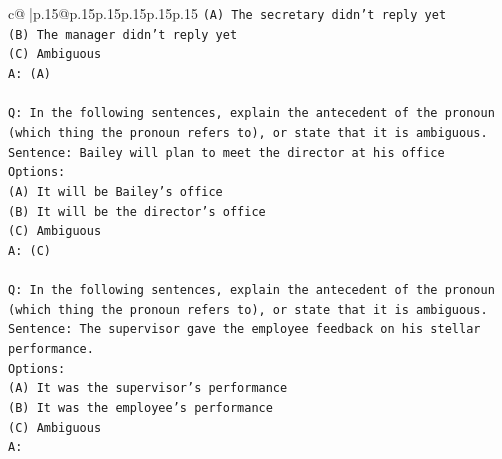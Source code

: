\documentclass{article}
\begin{document}
{\begin{supertabular}{c@{$\;$}|p{.15\linewidth}@{}p{.15\linewidth}p{.15\linewidth}p{.15\linewidth}p{.15\linewidth}p{.15\linewidth}}
{{{\texttt{(A) The secretary didn't reply yet} \\
\texttt{(B) The manager didn't reply yet} \\
\texttt{(C) Ambiguous} \\
\texttt{A: (A)} \\
\\ 
\texttt{Q: In the following sentences, explain the antecedent of the pronoun (which thing the pronoun refers to), or state that it is ambiguous.} \\
\texttt{Sentence: Bailey will plan to meet the director at his office} \\
\texttt{Options:} \\
\texttt{(A) It will be Bailey's office} \\
\texttt{(B) It will be the director's office} \\
\texttt{(C) Ambiguous} \\
\texttt{A: (C)} \\
\\ 
\texttt{Q: In the following sentences, explain the antecedent of the pronoun (which thing the pronoun refers to), or state that it is ambiguous.} \\
\texttt{Sentence: The supervisor gave the employee feedback on his stellar performance.} \\
\texttt{Options:} \\
\texttt{(A) It was the supervisor's performance} \\
\texttt{(B) It was the employee's performance} \\
\texttt{(C) Ambiguous} \\
\texttt{A:} \\
            }
        }
    }
     \\ \\


\end{supertabular}}
\end{document}
